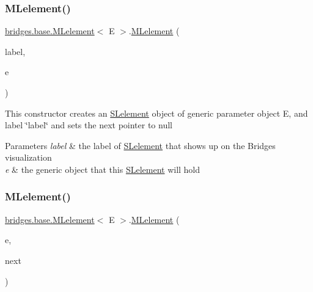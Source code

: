 \subsubsection{\texorpdfstring{MLelement()}{MLelement()}\hspace{0.1cm}{\footnotesize\ttfamily [2/4]}}
{\footnotesize\ttfamily \mbox{\hyperlink{classbridges_1_1base_1_1_m_lelement}{bridges.\+base.\+M\+Lelement}}$<$ E $>$.\mbox{\hyperlink{classbridges_1_1base_1_1_m_lelement}{M\+Lelement}} (\begin{DoxyParamCaption}\item[{String}]{label,  }\item[{E}]{e }\end{DoxyParamCaption})}

This constructor creates an \mbox{\hyperlink{classbridges_1_1base_1_1_s_lelement}{S\+Lelement}} object of generic parameter object E, and label \char`\"{}label\char`\"{} and sets the next pointer to null


\begin{DoxyParams}{Parameters}
{\em label} & the label of \mbox{\hyperlink{classbridges_1_1base_1_1_s_lelement}{S\+Lelement}} that shows up on the Bridges visualization \\
\hline
{\em e} & the generic object that this \mbox{\hyperlink{classbridges_1_1base_1_1_s_lelement}{S\+Lelement}} will hold \\
\hline
\end{DoxyParams}
\mbox{\label{classbridges_1_1base_1_1_m_lelement_ad3d5fe59028cd6854eb2abceefad7f7d}} 
\subsubsection{\texorpdfstring{MLelement()}{MLelement()}\hspace{0.1cm}{\footnotesize\ttfamily [3/4]}}
{\footnotesize\ttfamily \mbox{\hyperlink{classbridges_1_1base_1_1_m_lelement}{bridges.\+base.\+M\+Lelement}}$<$ E $>$.\mbox{\hyperlink{classbridges_1_1base_1_1_m_lelement}{M\+Lelement}} (\begin{DoxyParamCaption}\item[{E}]{e,  }\item[{\mbox{\hyperlink{classbridges_1_1base_1_1_m_lelement}{M\+Lelement}}$<$ E $>$}]{next }\end{DoxyParamCaption})}

